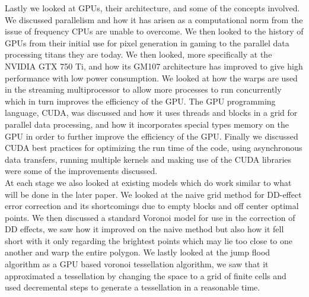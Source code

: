 Lastly we looked at GPUs, their architecture, and some of the concepts involved. We discussed parallelism and how it has arisen as a computational norm from the issue of frequency CPUs are unable to overcome. We then looked to the history of GPUs from their initial use for pixel generation in gaming to the parallel data processing titans they are today. We then looked, more specifically at the NVIDIA GTX 750 Ti, and how its GM107 architecture has improved to give high performance with low power consumption. We looked at how the warps are used in the streaming multiprocessor to allow more processes to run concurrently which in turn improves the efficiency of the GPU. The GPU programming language, CUDA, was discussed and how it uses threads and blocks in a grid for parallel data processing, and how it incorporates special types memory on the GPU in order to further improve the efficiency of the GPU. Finally we discussed CUDA best practices for optimizing the run time of the code, using asynchronous data transfers, running multiple kernels and making use of the CUDA libraries were some of the improvements discussed.
\\
At each stage we also looked at existing models which do work similar to what will be done in the later paper. We looked at the naive grid method for DD-effect error correction and its shortcomings due to empty blocks and off center optimal points. We then discussed a standard Voronoi model for use in the correction of DD effects, we saw how it improved on the naive method but also how it fell short with it only regarding the brightest points which may lie too close to one another and warp the entire polygon. We lastly looked at the jump flood algorithm as a GPU based voronoi tessellation algorithm, we saw that it approximated a tessellation by changing the space to a grid of finite cells and used decremental steps to generate a tessellation in a reasonable time.
